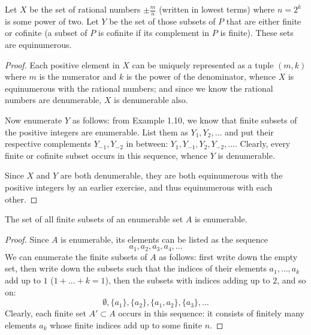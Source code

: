 \begin{exercise}[1.5]
  Let $X$ be the set of rational numbers $\pm\frac{m}{n}$ (written in lowest terms) where $n = 2^k$ is some power of two.
  Let $Y$ be the set of those subsets of $P$ that are either finite or cofinite (a subset of $P$ is cofinite if its complement in $P$ is finite).
  These sets are equinumerous.
\end{exercise}
\begin{proof}
  Each positive element in $X$ can be uniquely represented as a tuple $(m,k)$ where $m$ is the numerator and $k$ is the power of the denominator, whence $X$ is equinumerous with the rational numbers; and since we know the rational numbers are denumerable, $X$ is denumerable also.

  Now enumerate $Y$ as follows: from Example 1.10, we know that finite subsets of the positive integers are enumerable.
  List them as $Y_1,Y_2, \ldots$ and put their respective complements $Y_{-1}, Y_{-2}$ in between: $Y_1, Y_{-1}, Y_2, Y_{-2}, \ldots$.
  Clearly, every finite or cofinite subset occurs in this sequence, whence $Y$ is denumerable.

  Since $X$ and $Y$ are both denumerable, they are both equinumerous with the positive integers by an earlier exercise, and thus equinumerous with each other.
\end{proof}

\begin{exercise}[1.6]
  The set of all finite subsets of an enumerable set $A$ is enumerable.
\end{exercise}
\begin{proof}
  Since $A$ is enumerable, its elements can be listed as the sequence
  \begin{equation*}
    a_1, a_2, a_3, a_4, \ldots
  \end{equation*}
  We can enumerate the finite subsets of $A$ as follows: first write down the empty set, then write down the subsets such that the indices of their elements $a_1, \ldots, a_k$ add up to $1$ ($1 + \ldots + k = 1$), then the subsets with indices adding up to $2$, and so on:
  \begin{equation}
    \emptyset, \{a_1\}, \{a_2\}, \{a_1, a_2\}, \{a_3\}, \ldots
  \end{equation}
  Clearly, each finite set $A' \subset A$ occurs in this sequence: it consists of finitely many elements $a_k$ whose finite indices add up to some finite $n$.
\end{proof}

